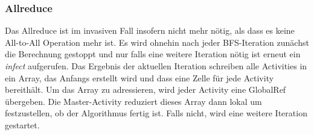 \subsubsection{Allreduce} %
\label{ssub:allreduce_invasive}
Das Allreduce ist im invasiven Fall insofern nicht mehr nötig, als dass es keine All-to-All Operation mehr ist. Es wird ohnehin nach jeder BFS-Iteration zunächst die Berechnung gestoppt und nur falls eine weitere Iteration nötig ist erneut ein \textit{infect} aufgerufen. Das Ergebnis der aktuellen Iteration schreiben alle Activities in ein Array, das Anfangs erstellt wird und dass eine Zelle für jede Activity bereithält. Um das Array zu adressieren, wird jeder Activity eine GlobalRef übergeben. Die Master-Activity reduziert dieses Array dann lokal um festzustellen, ob der Algorithmus fertig ist. Falls nicht, wird eine weitere Iteration gestartet.


